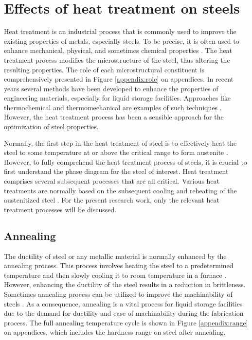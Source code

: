 \section{Effects of heat treatment on steels}
\label{ch3:anchor:section:treatment}
Heat treatment is an industrial process that is commonly used to improve the existing properties of metals, especially steels. To be precise, it is often used to enhance mechanical, physical, and sometimes chemical properties \cite{mampuya2021effect}. The heat treatment process modifies the microstructure of the steel, thus altering the resulting properties. The role of each microstructural constituent is comprehensively presented in Figure \ref{appendix:role} on appendices. In recent years several methods have been developed to enhance the properties of engineering materials, especially for liquid storage facilities. Approaches like thermochemical and thermomechanical are examples of such techniques \cite{singh2020applied}. However, the heat treatment process has been a sensible approach for the optimization of steel properties.

Normally, the first step in the heat treatment of steel is to effectively heat the steel to some temperature at or above the critical range to form austenite \cite{mampuya2021effect}. However, to fully comprehend the heat treatment process of steels, it is crucial to first understand the phase diagram for the steel of interest. Heat treatment comprises several subsequent processes that are all critical. Various heat treatments are normally based on the subsequent cooling and reheating of the austenitized steel \cite{singh2020applied}.  For the present research work, only the relevant heat treatment processes will be discussed.

\subsection{Annealing}
The ductility of steel or any metallic material is normally enhanced by the annealing process. This process involves heating the steel to a predetermined temperature and then slowly cooling it to room temperature in a furnace \cite{singh2020applied}. However, enhancing the ductility of the steel results in a reduction in brittleness. Sometimes annealing process can be utilized to improve the machinability of steels \cite{nikkhah2019improved}. As a consequence, annealing is a vital process for liquid storage facilities due to the demand for ductility and ease of machinability during the fabrication process. The full annealing temperature cycle is shown in Figure \ref{appendix:range} on appendices, which includes the hardness range on steel after annealing. 

